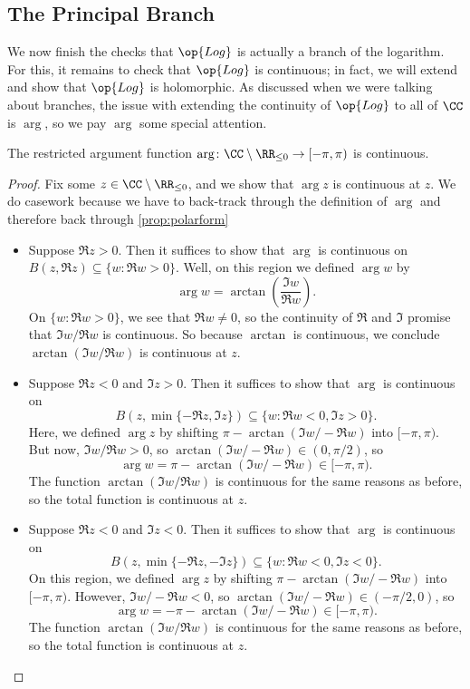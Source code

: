 \subsection{The Principal Branch}
We now finish the checks that $\op{Log}$ is actually a branch of the logarithm. For this, it remains to check that $\op{Log}$ is continuous; in fact, we will extend and show that $\op{Log}$ is holomorphic. As discussed when we were talking about branches, the issue with extending the continuity of $\op{Log}$ to all of $\CC$ is $\arg$, so we pay $\arg$ some special attention.
\begin{lemma} \label{lem:argcont}
	The restricted argument function $\arg\colon \CC\setminus\RR_{\le0}\to[-\pi,\pi)$ is continuous.
\end{lemma}
\begin{proof}
	Fix some $z\in\CC\setminus\RR_{\le0}$, and we show that $\arg z$ is continuous at $z$. We do casework because we have to back-track through the definition of $\arg$ and therefore back through \autoref{prop:polarform}
	\begin{itemize}
		\item Suppose $\Re z>0$. Then it suffices to show that $\arg$ is continuous on $B(z,\Re z)\subseteq\{w:\Re w>0\}$. Well, on this region we defined $\arg w$ by
		\[\arg w=\arctan\left(\frac{\Im w}{\Re w}\right).\]
		On $\{w:\Re w>0\}$, we see that $\Re w\ne0$, so the continuity of $\Re$ and $\Im$ promise that $\Im w/\Re w$ is continuous. So because $\arctan$ is continuous, we conclude $\arctan(\Im w/\Re w)$ is continuous at $z$.
		\item Suppose $\Re z<0$ and $\Im z>0$. Then it suffices to show that $\arg$ is continuous on
		\[B(z,\min\{-\Re z,\Im z\})\subseteq\{w:\Re w<0,\Im z>0\}.\]
		Here, we defined $\arg z$ by shifting $\pi-\arctan(\Im w/-\Re w)$ into $[-\pi,\pi)$. But now, $\Im w/\Re w>0$, so $\arctan(\Im w/-\Re w)\in(0,\pi/2)$, so
		\[\arg w=\pi-\arctan(\Im w/-\Re w)\in[-\pi,\pi).\]
		The function $\arctan(\Im w/\Re w)$ is continuous for the same reasons as before, so the total function is continuous at $z$.
		\item Suppose $\Re z<0$ and $\Im z<0$. Then it suffices to show that $\arg$ is continuous on
		\[B(z,\min\{-\Re z,-\Im z\})\subseteq\{w:\Re w<0,\Im z<0\}.\]
		On this region, we defined $\arg z$ by shifting $\pi-\arctan(\Im w/-\Re w)$ into $[-\pi,\pi)$. However, $\Im w/-\Re w<0$, so $\arctan(\Im w/-\Re w)\in(-\pi/2,0)$, so
		\[\arg w=-\pi-\arctan(\Im w/-\Re w)\in[-\pi,\pi).\]
		The function $\arctan(\Im w/\Re w)$ is continuous for the same reasons as before, so the total function is continuous at $z$.

\end{itemize}
\end{proof}
